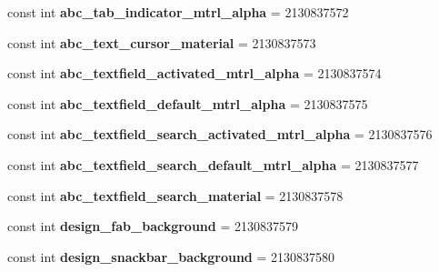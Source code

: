 \begin{DoxyCompactItemize}
const int {\bfseries abc\+\_\+tab\+\_\+indicator\+\_\+mtrl\+\_\+alpha} = 2130837572
\item 
\mbox{\label{classXaria_1_1Resource_1_1Drawable_a9a040ed902d556d8bbec347cea4ff726}} 
const int {\bfseries abc\+\_\+text\+\_\+cursor\+\_\+material} = 2130837573
\item 
\mbox{\label{classXaria_1_1Resource_1_1Drawable_a7da5fc73c7da02eb6701dac43683a88a}} 
const int {\bfseries abc\+\_\+textfield\+\_\+activated\+\_\+mtrl\+\_\+alpha} = 2130837574
\item 
\mbox{\label{classXaria_1_1Resource_1_1Drawable_a1deab89f3453a39b5a2b9e8eb27ccf27}} 
const int {\bfseries abc\+\_\+textfield\+\_\+default\+\_\+mtrl\+\_\+alpha} = 2130837575
\item 
\mbox{\label{classXaria_1_1Resource_1_1Drawable_a3f039af1fb7e2ef680b5a1da7d93ddc1}} 
const int {\bfseries abc\+\_\+textfield\+\_\+search\+\_\+activated\+\_\+mtrl\+\_\+alpha} = 2130837576
\item 
\mbox{\label{classXaria_1_1Resource_1_1Drawable_ab106f39dd55c2831bc3aa25f1aed5c90}} 
const int {\bfseries abc\+\_\+textfield\+\_\+search\+\_\+default\+\_\+mtrl\+\_\+alpha} = 2130837577
\item 
\mbox{\label{classXaria_1_1Resource_1_1Drawable_a3ad23ec153b7d3aa1944148ee6693893}} 
const int {\bfseries abc\+\_\+textfield\+\_\+search\+\_\+material} = 2130837578
\item 
\mbox{\label{classXaria_1_1Resource_1_1Drawable_a8793f3bc1305c08fca341502ccfafaf4}} 
const int {\bfseries design\+\_\+fab\+\_\+background} = 2130837579
\item 
\mbox{\label{classXaria_1_1Resource_1_1Drawable_a4529273591b386cfe5e901d5ee356f50}} 
const int {\bfseries design\+\_\+snackbar\+\_\+background} = 2130837580
\item 
\mbox{\label{classXaria_1_1Resource_1_1Drawable_addff21b70d545f83ae63336e35a65cff}} 

\end{DoxyCompactItemize}
